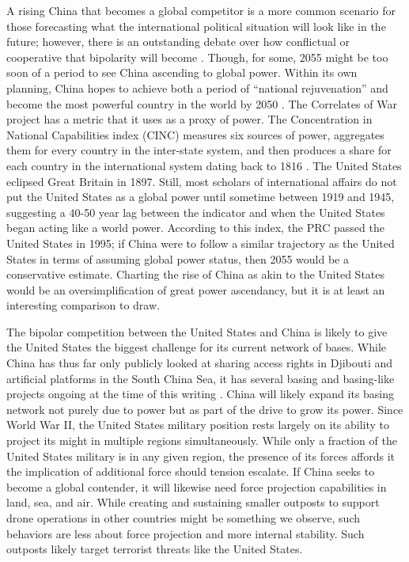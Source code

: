A rising China that becomes a global competitor is a more common scenario for those forecasting what the international political situation will look like in the future; however, there is an outstanding debate over how conflictual or cooperative that bipolarity will become \cite{maher2018,ross1999}. Though, for some, 2055 might be too soon of a period to see China ascending to global power. Within its own planning, China hopes to achieve both a period of ``national rejuvenation'' and become the most powerful country in the world by 2050 \cite{Doshi2021}. The Correlates of War project has a metric that it uses as a proxy of power. The Concentration in National Capabilities index (CINC) measures six sources of power, aggregates them for every country in the inter-state system, and then produces a share for each country in the international system dating back to 1816 \cite{Singer1972,Singer1987}. The United States eclipsed Great Britain in 1897. Still, most scholars of international affairs do not put the United States as a global power until sometime between 1919 and 1945, suggesting a 40-50 year lag between the indicator and when the United States began acting like a world power. According to this index, the PRC passed the United States in 1995; if China were to follow a similar trajectory as the United States in terms of assuming global power status, then 2055 would be a conservative estimate. Charting the rise of China as akin to the United States would be an oversimplification of great power ascendancy, but it is at least an interesting comparison to draw. 

The bipolar competition between the United States and China is likely to give the United States the biggest challenge for its current network of bases. While China has thus far only publicly looked at sharing access rights in Djibouti and artificial platforms in the South China Sea, it has several basing and basing-like projects ongoing at the time of this writing \cite{Doshi2021}. China will likely expand its basing network not purely due to power but as part of the drive to grow its power. Since World War II, the United States military position rests largely on its ability to project its might in multiple regions simultaneously. While only a fraction of the United States military is in any given region, the presence of its forces affords it the implication of additional force should tension escalate. If China seeks to become a global contender, it will likewise need force projection capabilities in land, sea, and air. While creating and sustaining smaller outposts to support drone operations in other countries might be something we observe, such behaviors are less about force projection and more internal stability. Such outposts likely target terrorist threats like the United States.

